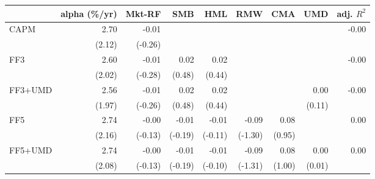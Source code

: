 \begin{tabular}{lrrrrrrrr}
\toprule
 & alpha (\%/yr) & Mkt-RF & SMB & HML & RMW & CMA & UMD & adj. $R^2$ \\
\midrule
CAPM & 2.70 & -0.01 &  &  &  &  &  & -0.00 \\
 & (2.12) & (-0.26) &  &  &  &  &  &  \\[2pt]
FF3 & 2.60 & -0.01 & 0.02 & 0.02 &  &  &  & -0.00 \\
 & (2.02) & (-0.28) & (0.48) & (0.44) &  &  &  &  \\[2pt]
FF3+UMD & 2.56 & -0.01 & 0.02 & 0.02 &  &  & 0.00 & -0.00 \\
 & (1.97) & (-0.26) & (0.48) & (0.44) &  &  & (0.11) &  \\[2pt]
FF5 & 2.74 & -0.00 & -0.01 & -0.01 & -0.09 & 0.08 &  & 0.00 \\
 & (2.16) & (-0.13) & (-0.19) & (-0.11) & (-1.30) & (0.95) &  &  \\[2pt]
FF5+UMD & 2.74 & -0.00 & -0.01 & -0.01 & -0.09 & 0.08 & 0.00 & 0.00 \\
 & (2.08) & (-0.13) & (-0.19) & (-0.10) & (-1.31) & (1.00) & (0.01) &  \\[2pt]
\bottomrule
\end{tabular}
